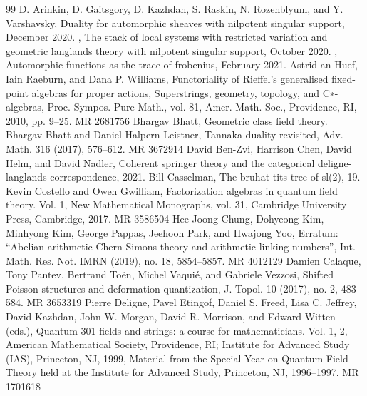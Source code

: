 \begin{thebibliography}{99}
\small
{} D. Arinkin, D. Gaitsgory, D. Kazhdan, S. Raskin, N. Rozenblyum, and Y. Varshavsky, Duality for automorphic sheaves with nilpotent singular support, December 2020.
 , The stack of local systems with restricted variation and geometric langlands theory with nilpotent singular support, October 2020.
 , Automorphic functions as the trace of frobenius, February 2021.
 Astrid an Huef, Iain Raeburn, and Dana P. Williams, Functoriality of Rieffel’s generalised fixed-point algebras for proper actions, Superstrings, geometry, topology, and C∗-algebras, Proc. Sympos. Pure Math., vol. 81, Amer. Math. Soc., Providence, RI, 2010, pp. 9–25. MR 2681756
 Bhargav Bhatt, Geometric class field theory.
 Bhargav Bhatt and Daniel Halpern-Leistner, Tannaka duality revisited, Adv. Math. 316 (2017), 576–612. MR 3672914
 David Ben-Zvi, Harrison Chen, David Helm, and David Nadler, Coherent springer theory and the categorical deligne-langlands correspondence, 2021.
 Bill Casselman, The bruhat-tits tree of sl(2), 19.
 Kevin Costello and Owen Gwilliam, Factorization algebras in quantum field theory. Vol. 1, New Mathematical Monographs, vol. 31, Cambridge University Press, Cambridge, 2017. MR 3586504
 Hee-Joong Chung, Dohyeong Kim, Minhyong Kim, George Pappas, Jeehoon Park, and Hwajong Yoo, Erratum: “Abelian arithmetic Chern-Simons theory and arithmetic linking numbers”, Int. Math. Res. Not. IMRN (2019), no. 18, 5854–5857. MR 4012129
 Damien Calaque, Tony Pantev, Bertrand Toën, Michel Vaquié, and Gabriele Vezzosi, Shifted Poisson structures and deformation quantization, J. Topol. 10 (2017), no. 2, 483–584. MR 3653319
 Pierre Deligne, Pavel Etingof, Daniel S. Freed, Lisa C. Jeffrey, David Kazhdan, John W. Morgan, David R. Morrison, and Edward Witten (eds.), Quantum 301 fields and strings: a course for mathematicians. Vol. 1, 2, American Mathematical Society, Providence, RI; Institute for Advanced Study (IAS), Princeton, NJ, 1999, Material from the Special Year on Quantum Field Theory held at the Institute for Advanced Study, Princeton, NJ, 1996–1997. MR 1701618

\end{thebibliography}
